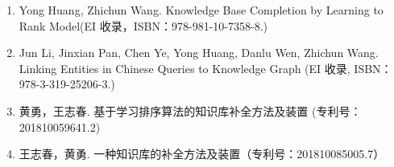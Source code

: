 \begin{paper}
\begin{enumerate}
  \item Yong Huang, Zhichun Wang. Knowledge Base Completion by Learning to Rank Model(EI 收录，ISBN：978-981-10-7358-8.)
  \item Jun Li, Jinxian Pan, Chen Ye, Yong Huang, Danlu Wen, Zhichun Wang. 
  Linking Entities in Chinese Queries to Knowledge Graph (EI 收录, ISBN：978-3-319-25206-3.)
  \item 黄勇，王志春. 基于学习排序算法的知识库补全方法及装置 (专利号：201810059641.2)
  \item 王志春，黄勇. 一种知识库的补全方法及装置（专利号：201810085005.7）
  \end{enumerate}
\end{paper}
